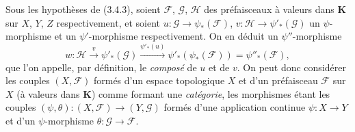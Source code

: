 \begin{env}[3.5.2]
\label{0.3.5.2-fr}
Sous les hypothèses de (3.4.3), soient $\mathcal{F}$, $\mathcal{G}$,
$\mathcal{H}$ des préfaisceaux à valeurs dans $\mathbf{K}$ sur $X$, $Y$, $Z$
respectivement, et soient
$u:\mathcal{G}\to\psi_*(\mathcal{F})$,
$v:\mathcal{H}\to\psi'_*(\mathcal{G})$ un $\psi$-morphisme et un
$\psi'$-morphisme respectivement. On en déduit un $\psi''$-morphisme
\[
  w:\mathcal{H}\xrightarrow{v}\psi'_*(\mathcal{G})
  \xrightarrow{\psi'_*(u)}
  \psi'_*(\psi_*(\mathcal{F}))=\psi''_*(\mathcal{F}),
\]
que l'on appelle, par définition, le \emph{composé} de $u$ et de $v$. On peut
donc considérer les couples $(X,\mathcal{F})$ formés d'un espace topologique
$X$ et d'un préfaisceau $\mathcal{F}$ sur $X$ (à valeurs dans $\mathbf{K}$)
comme formant une \emph{catégorie}, les morphismes étant les couples
$(\psi,\theta):(X,\mathcal{F})\to(Y,\mathcal{G})$ formés d'une application
continue $\psi:X\to Y$ et d'un $\psi$-morphisme
$\theta:\mathcal{G}\to\mathcal{F}$.
\end{env}

